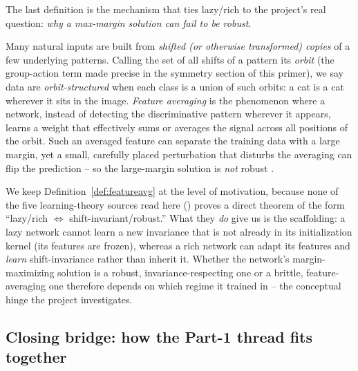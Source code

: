 The last definition is the mechanism that ties lazy/rich to the project's
real question: \emph{why a max-margin solution can fail to be robust}.

\begin{definition}
\label{def:featureavg}
Many natural inputs are built from \emph{shifted (or otherwise
transformed) copies} of a few underlying patterns. Calling the set of all
shifts of a pattern its \emph{orbit} (the group-action term made precise in
the symmetry section of this primer), we say data are
\emph{orbit-structured} when each class is a union of such orbits: a cat is
a cat wherever it sits in the image. \emph{Feature averaging} is the
phenomenon where a network, instead of detecting the discriminative
pattern wherever it appears, learns a weight that effectively sums or
averages the signal across all positions of the orbit. Such an averaged
feature can separate the training data with a large margin, yet a small,
carefully placed perturbation that disturbs the averaging can flip the
prediction -- so the large-margin solution is \emph{not} robust
\citep{li2025feature}.
\end{definition}

We keep Definition~\ref{def:featureavg} at the level of motivation,
because none of the five learning-theory sources read here
(\citealp{soudry2018, lyuli2020, jitelgarsky2019, jacot2018, chizat2019})
proves a direct theorem of the form ``lazy/rich $\Leftrightarrow$
shift-invariant/robust.'' What they \emph{do} give us is the scaffolding:
a lazy network cannot learn a new invariance that is not already in its
initialization kernel (its features are frozen), whereas a rich network
can adapt its features and \emph{learn} shift-invariance rather than
inherit it. Whether the network's margin-maximizing solution is a robust,
invariance-respecting one or a brittle, feature-averaging one therefore
depends on which regime it trained in -- the conceptual hinge the project
investigates.


\subsection*{Closing bridge: how the Part-1 thread fits together}

